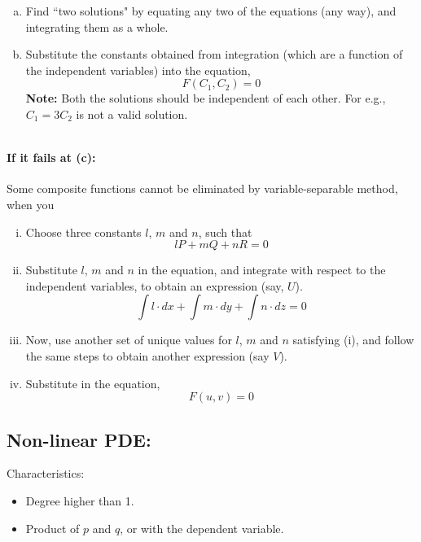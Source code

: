 \documentclass{article}
\begin{document}
{\begin{enumerate}[(a)]
\textbf{Note:} Independent variables should never be treated as constants during this integration. For e.g., you cannot have a $y$ term along with the $x$ terms as a product, and treat them as a constant during the integration with respect to $x$.
\item Find ``two solutions" by equating any two of the equations (any way), and integrating them as a whole.
\item Substitute the constants obtained from integration (which are a function of the independent variables) into the equation,
$$F(C_1,C_2)=0$$
\textbf{Note:} Both the solutions should be independent of each other. For e.g., $C_1=3C_2$ is not a valid solution.
\end{enumerate}
$\ $
\paragraph{\Large If it fails at (c):} Some composite functions cannot be eliminated by variable-separable method, when you
\begin{enumerate}[(i)]
\item Choose three constants $l$, $m$ and $n$, such that {\LARGE $$lP+mQ+nR=0$$}
\item Substitute $l$, $m$ and $n$ in the equation, and integrate with respect to the independent variables, to obtain an expression (say, $U$). {\LARGE $$\int l\cdot dx+\int m\cdot dy+\int n\cdot dz=0$$}
\item Now, use another set of unique values for $l$, $m$ and $n$ satisfying (i), and follow the same steps to obtain another expression (say $V$).
\item Substitute in the equation,
{\LARGE $$F(u,v)=0$$}
\end{enumerate}
\newpage
\subsection{\LARGE Non-linear PDE:}
Characteristics:
\begin{itemize}
\item Degree higher than 1.
\item Product of $p$ and $q$, or with the dependent variable.
\end{itemize}
$\ $
}
\end{document}

